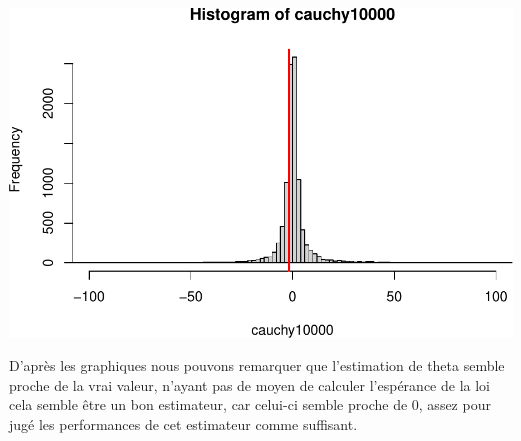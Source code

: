 \documentclass[
]{article}
\begin{document}
\includegraphics{tp2_files/figure-latex/unnamed-chunk-9-4.pdf}

D'après les graphiques nous pouvons remarquer que l'estimation de theta
semble proche de la vrai valeur, n'ayant pas de moyen de calculer
l'espérance de la loi cela semble être un bon estimateur, car celui-ci
semble proche de 0, assez pour jugé les performances de cet estimateur
comme suffisant.
\end{document}
